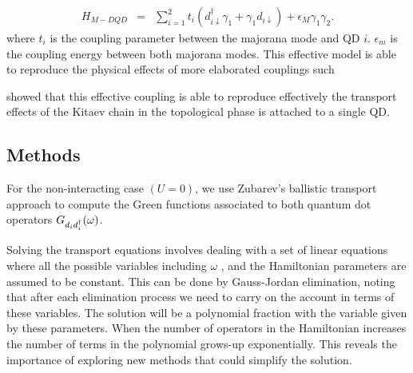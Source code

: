 \documentclass[showpacs,aps,prb,reprint,superscriptaddress]{revtex4-1}
\newcommand{\Jesus}[1]{\textcolor{red}{\fbox{Jesus} {\sl#1}}}
\begin{document}
\begin{eqnarray}
H_{M-DQD} & = &  \sum_{i=1}^2t_{i} \left(d_{i\downarrow}^{\dagger}\gamma_{1}+\gamma_{1}d_{i\downarrow}\right) + \epsilon_M \gamma_1\gamma_2. 
\label{eq:H_MDQD}
\end{eqnarray}
where $t_i$ is the coupling parameter between the majorana mode and QD $i$. $\epsilon_m$ is the coupling energy between both majorana modes. This effective model is able to reproduce the physical effects of more elaborated couplings \cite{ruiz-tijerina_interaction_2015} such 

\citeauthor{ruiz-tijerina_interaction_2015}  showed that this effective coupling  is able to reproduce effectively the transport effects of  the Kitaev chain in the topological phase is attached to a single QD.  \\








 
\subsection{Methods}
For the non-interacting case $(U=0)$, we use Zubarev's ballistic transport approach \cite{zubarev_double-time_1960} to compute the Green functions associated to both quantum dot operators $G_{d_id^\dagger_i}(\omega)$.

Solving the transport equations involves dealing with a set of linear equations where all the possible variables including  $\omega$ , and the Hamiltonian parameters are assumed to be constant.  This can be done by  Gauss-Jordan elimination, noting that after each elimination process we need to carry on the account in terms of these variables. The solution  will be a polynomial fraction with the variable given by these parameters.  When the number of operators in the Hamiltonian increases the number of terms in the polynomial grows-up exponentially. This reveals the importance of exploring new methods that could simplify the solution.   \\
\end{document}
